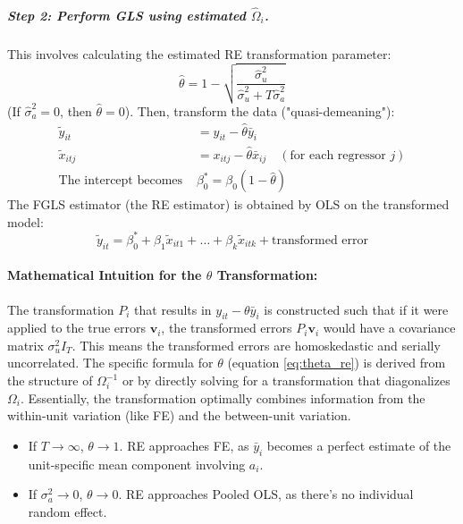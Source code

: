 \documentclass[a4paper, 10pt]{article}
\theoremstyle{definition}	%
\begin{document}
\subparagraph{Step 2: Perform GLS using estimated \(\hat{\Omega}_i\).}
This involves calculating the estimated RE transformation parameter:
\[ \hat{\theta} = 1 - \sqrt{\frac{\hat{\sigma}_u^2}{\hat{\sigma}_u^2 + T\hat{\sigma}_a^2}} \]
(If \(\hat{\sigma}_a^2 = 0\), then \(\hat{\theta}=0\)).
Then, transform the data ("quasi-demeaning"):
\begin{align*}
\tilde{y}_{it} &= y_{it} - \hat{\theta} \bar{y}_i \\
\tilde{x}_{itj} &= x_{itj} - \hat{\theta} \bar{x}_{ij} \quad (\text{for each regressor } j) \\
\text{The intercept becomes } &\beta_0^* = \beta_0(1-\hat{\theta})
\end{align*}
The FGLS estimator (the RE estimator) is obtained by OLS on the transformed model:
\[ \tilde{y}_{it} = \beta_0^* + \beta_1 \tilde{x}_{it1} + \dots + \beta_k \tilde{x}_{itk} + \text{transformed error} \]

\paragraph{Mathematical Intuition for the \(\theta\) Transformation:}
The transformation \(P_i\) that results in \(y_{it} - \theta \bar{y}_i\) is constructed such that if it were applied to the true errors \(\mathbf{v}_i\), the transformed errors \(P_i \mathbf{v}_i\) would have a covariance matrix \(\sigma_u^2 I_T\). This means the transformed errors are homoskedastic and serially uncorrelated. The specific formula for \(\theta\) (equation \ref{eq:theta_re}) is derived from the structure of \(\Omega_i^{-1}\) or by directly solving for a transformation that diagonalizes \(\Omega_i\).
Essentially, the transformation optimally combines information from the within-unit variation (like FE) and the between-unit variation.
\begin{itemize}
    \item If \(T \to \infty\), \(\theta \to 1\). RE approaches FE, as \(\bar{y}_i\) becomes a perfect estimate of the unit-specific mean component involving \(a_i\).
    \item If \(\sigma_a^2 \to 0\), \(\theta \to 0\). RE approaches Pooled OLS, as there's no individual random effect.
\end{itemize}
\end{document}
